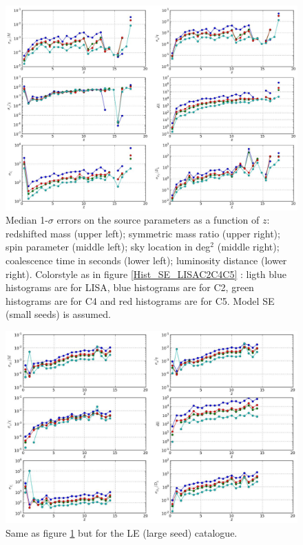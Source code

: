 \documentclass{iopart}
\begin{document}
\begin{figure}[H]
\center
   \includegraphics[width=\textwidth]{FigSMBHPhenomAEI/MedianErrs_SE_LISAC2C4C5.eps}
\caption{Median 1-$\sigma$ errors on the source parameters as a function of 
$z$: redshifted mass (upper left); symmetric mass ratio (upper right); spin parameter (middle left); sky location in deg$^2$ (middle right); coalescence time in seconds (lower left); luminosity distance (lower right). Colorstyle as in figure \ref{Hist_SE_LISAC2C4C5} : ligth blue histograms are for LISA, blue histograms are for C2, green histograms are for C4 and red histograms are for C5. Model SE (small seeds) is assumed.
\label{MedianErrs_SE_LISAC2C4C5} } 
\end{figure}

\begin{figure}[H]
\center
   \includegraphics[width=1\textwidth]{FigSMBHPhenomAEI/MedianErrs_LE_LISAC2C4C5.eps}
\caption{Same as figure \ref{MedianErrs_SE_LISAC2C4C5} but for the LE (large seed) catalogue.
\label{MedianErrs_LE_LISAC2C4C5} } 
\end{figure}
\end{document}
